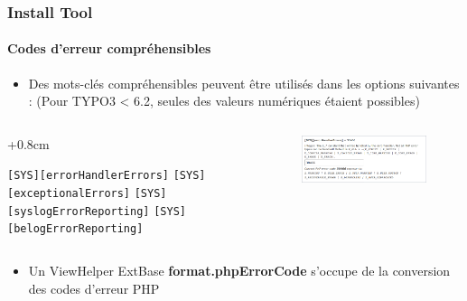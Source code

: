 
\begin{frame}[fragile]
	\frametitle{Install Tool}
	\framesubtitle{Codes d'erreur compréhensibles}

	\begin{itemize}
		\item Des mots-clés compréhensibles peuvent être utilisés dans les options suivantes :\newline
			(Pour TYPO3 < 6.2, seules des valeurs numériques étaient possibles)
	\end{itemize}

	\begin{columns}[T]
		\begin{column}{.4\textwidth}
			\advance\leftskip+0.8cm

			\smaller
				\texttt{[SYS][errorHandlerErrors]}\newline
				\texttt{[SYS][exceptionalErrors]}\newline
				\texttt{[SYS][syslogErrorReporting]}\newline
				\texttt{[SYS][belogErrorReporting]}\newline
			\normalsize

		\end{column}
		\begin{column}{.6\textwidth}

			\begin{figure}\vspace*{-0.4cm}
				\includegraphics[width=0.9\linewidth]{Images/InstallTool/HumanFriendlyErrorCodes.png}
			\end{figure}

		\end{column}
	\end{columns}

	\vspace{0.2cm}

	\begin{itemize}
		\item Un ViewHelper ExtBase \textbf{format.phpErrorCode} s'occupe de la conversion des codes d'erreur PHP
	\end{itemize}

\end{frame}

